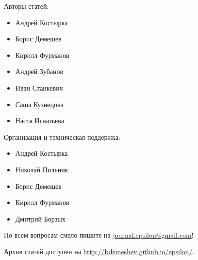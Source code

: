 \documentclass[12pt]{article}
\begin{document}
\pagestyle{empty}




Авторы статей:

\begin{itemize}
\item Андрей Костырка
\item Борис Демешев
\item Кирилл Фурманов
\item Андрей Зубанов
\item Иван Станкевич
\item Саша Кузнецова 
\item Настя Игнатьева
\end{itemize}


Организация и техническая поддержка:

\begin{itemize}
\item Андрей Костырка 
\item Николай Пильник 
\item Борис Демешев 
\item Кирилл Фурманов 
\item Дмитрий Борзых
\end{itemize}

По всем вопросам смело пишите на \href{mailto:journal.epsilon@gmail.com}{journal.epsilon@gmail.com}!

Архив статей доступен на \url{http://bdemeshev.github.io/epsilon/}.
\end{document}
